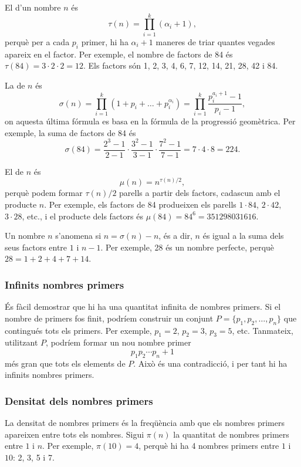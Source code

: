 El  d'un nombre $n$ és
\[\tau(n)=\prod_{i=1}^k (\alpha_i+1),\]
perquè per a cada $p_i$ primer, hi ha $\alpha_i+1$ maneres de triar
quantes vegades apareix en el factor. Per exemple, el nombre de
factors de 84 és $\tau(84)=3 \cdot 2 \cdot 2 = 12$. Els factors són 1,
2, 3, 4, 6, 7, 12, 14, 21, 28, 42 i 84.

La  de $n$ és
\[\sigma(n)=\prod_{i=1}^k (1+p_i+\ldots+p_i^{\alpha_i}) = \prod_{i=1}^k \frac{p_i^{a_i+1}-1}{p_i-1},\]
on aquesta última fórmula es basa en la fórmula de la progressió
geomètrica. Per exemple, la suma de factors de 84 és
\[\sigma(84)=\frac{2^3-1}{2-1} \cdot \frac{3^2-1}{3-1} \cdot \frac{7^2-1}{7-1} = 7 \cdot 4 \cdot 8 = 224.\]


El  de $n$ és
\[\mu(n)=n^{\tau(n)/2},\]
perquè podem formar $\tau(n)/2$ parells a partir dels factors,
cadascun amb el producte $n$. Per exemple, els factors de 84
produeixen els parells $1 \cdot 84$, $2 \cdot 42$, $3 \cdot 28$, etc.,
i el producte dels factors és $\mu(84)=84^6=351298031616 $.


Un nombre $n$ s'anomena  si $n=\sigma(n)-n$, és a
dir, $n$ és igual a la suma dels seus factors entre $1$ i $n-1$. Per
exemple, 28 és un nombre perfecte, perquè $28=1+2+4+7+14$.

\subsubsection{Infinits nombres primers}

És fàcil demostrar que hi ha una quantitat infinita de nombres primers. Si
el nombre de primers fos finit, podríem construir un conjunt
$P=\{p_1,p_2,\ldots,p_n\}$ que contingués tots els primers. Per
exemple, $p_1=2$, $p_2=3$, $p_3=5$, etc. Tanmateix, utilitzant $P$,
podríem formar un nou nombre primer
\[p_1 p_2 \cdots p_n+1\]
més gran que tots els elements de $P$. Això és una contradicció, i per tant
hi ha infinits nombres primers.

\subsubsection{Densitat dels nombres primers}

La densitat de nombres primers és la freqüència amb que els nombres
primers apareixen entre tots els nombres. Sigui $\pi(n)$ la quantitat
de nombres primers entre $1$ i $n$. Per exemple, $\pi(10)=4$, perquè
hi ha 4 nombres primers entre $1$ i $10$: 2, 3, 5 i 7.

